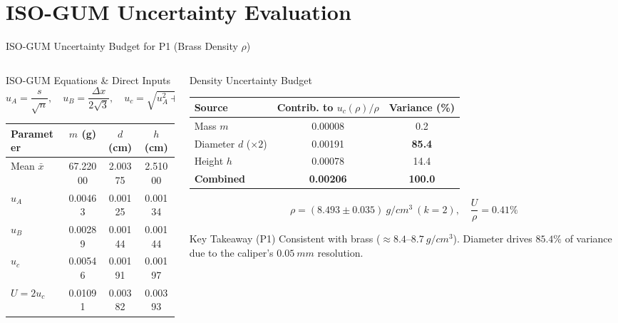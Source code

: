 \documentclass[aspectratio=169,10pt]{beamer}
\newcommand{\sm}{\fontsize{8.2}{10.2}\selectfont}
\newcommand{\xs}{\fontsize{7.1}{9}\selectfont}
\newcommand{\uc}{u_{c}}
\newcommand{\uA}{u_{A}}
\newcommand{\uB}{u_{B}}
\begin{document}
\section{ISO-GUM Uncertainty Evaluation}

\begin{frame}{ISO-GUM Uncertainty Budget for P1 (Brass Density $\rho$)}
\begin{columns}[T,onlytextwidth]
\begin{column}{.49\textwidth}
\begin{block}{ISO-GUM Equations \& Direct Inputs}\xs
$$\uA = \frac{s}{\sqrt{n}}, \quad \uB = \frac{\Delta x}{2\sqrt{3}}, \quad \uc = \sqrt{\uA^2+\uB^2}, \quad U = 2\uc$$
\centering
\setlength{\tabcolsep}{3.5pt}\begin{tabular}{@{}lccc@{}}
\toprule
\textbf{Parameter} & $m$ (g) & $d$ (cm) & $h$ (cm)\\
\midrule
Mean $\bar{x}$ & 67.22000 & 2.00375 & 2.51000\\
$\uA$ & 0.00463 & 0.00125 & 0.00134\\
$\uB$ & 0.00289 & 0.00144 & 0.00144\\
$\uc$ & 0.00546 & 0.00191 & 0.00197\\
$U = 2\uc$ & 0.01091 & 0.00382 & 0.00393\\
\bottomrule
\end{tabular}
\end{block}
\end{column}

\begin{column}{.49\textwidth}
\begin{exampleblock}{Density Uncertainty Budget}\xs
\centering
\begin{tabular}{@{}lcc@{}}
\toprule
\textbf{Source} & \textbf{Contrib. to $\uc(\rho)/\rho$} & \textbf{Variance (\%)}\\
\midrule
Mass $m$ & 0.00008 & 0.2\\
Diameter $d$ ($\times 2$) & 0.00191 & \textbf{85.4}\\
Height $h$ & 0.00078 & 14.4\\
\midrule
\textbf{Combined} & \textbf{0.00206} & \textbf{100.0}\\
\bottomrule
\end{tabular}
\par\vspace{2mm}\sm
$$\boxed{\rho = (8.493 \pm 0.035)\ \si{g/cm^3}\ (k=2), \quad \frac{U}{\rho}=0.41\%}$$
\end{exampleblock}
\begin{alertblock}{Key Takeaway (P1)}\xs
Consistent with brass ($\approx 8.4\text{--}8.7\ \si{g/cm^3}$). Diameter drives $85.4\%$ of variance due to the caliper's $\SI{0.05}{mm}$ resolution.
\end{alertblock}
\end{column}
\end{columns}
\end{frame}
\end{document}
